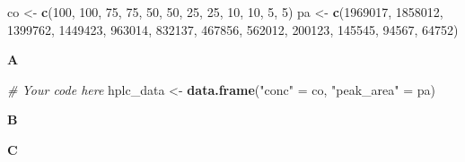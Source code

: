 \documentclass[]{book}
\newenvironment{Shaded}{\begin{snugshade}}{\end{snugshade}}
\newcommand{\CommentTok}[1]{\textcolor[rgb]{0.56,0.35,0.01}{\textit{#1}}}
\newcommand{\DataTypeTok}[1]{\textcolor[rgb]{0.13,0.29,0.53}{#1}}
\newcommand{\DecValTok}[1]{\textcolor[rgb]{0.00,0.00,0.81}{#1}}
\newcommand{\KeywordTok}[1]{\textcolor[rgb]{0.13,0.29,0.53}{\textbf{#1}}}
\newcommand{\NormalTok}[1]{#1}
\newcommand{\OperatorTok}[1]{\textcolor[rgb]{0.81,0.36,0.00}{\textbf{#1}}}
\newcommand{\StringTok}[1]{\textcolor[rgb]{0.31,0.60,0.02}{#1}}
\begin{document}
\begin{Shaded}
\begin{Highlighting}[]
\NormalTok{co <-}\StringTok{ }\KeywordTok{c}\NormalTok{(}\DecValTok{100}\NormalTok{,    }\DecValTok{100}\NormalTok{,    }\DecValTok{75}\NormalTok{, }\DecValTok{75}\NormalTok{, }\DecValTok{50}\NormalTok{, }\DecValTok{50}\NormalTok{, }\DecValTok{25}\NormalTok{, }\DecValTok{25}\NormalTok{, }\DecValTok{10}\NormalTok{, }\DecValTok{10}\NormalTok{, }\DecValTok{5}\NormalTok{, }\DecValTok{5}\NormalTok{)}
\NormalTok{pa <-}\StringTok{ }\KeywordTok{c}\NormalTok{(}\DecValTok{1969017}\NormalTok{,    }\DecValTok{1858012}\NormalTok{,    }\DecValTok{1399762}\NormalTok{,    }\DecValTok{1449423}\NormalTok{,    }\DecValTok{963014}\NormalTok{, }\DecValTok{832137}\NormalTok{, }\DecValTok{467856}\NormalTok{, }\DecValTok{562012}\NormalTok{, }\DecValTok{200123}\NormalTok{, }\DecValTok{145545}\NormalTok{, }\DecValTok{94567}\NormalTok{,  }\DecValTok{64752}\NormalTok{)}
\end{Highlighting}
\end{Shaded}

\textbf{A}

\begin{Shaded}
\begin{Highlighting}[]
\CommentTok{# Your code here}
\NormalTok{hplc_data <-}\StringTok{ }\KeywordTok{data.frame}\NormalTok{(}\StringTok{"conc"}\NormalTok{ =}\StringTok{ }\NormalTok{co, }\StringTok{"peak_area"}\NormalTok{ =}\StringTok{ }\NormalTok{pa)}
\end{Highlighting}
\end{Shaded}

\textbf{B}

\begin{Shaded}
\end{Shaded}

\textbf{C}

\begin{Shaded}
\end{Shaded}
\end{document}
